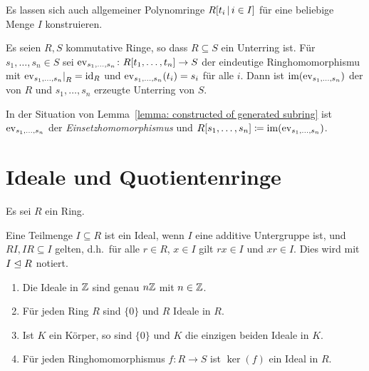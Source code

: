 \begin{remark}
  Es lassen sich auch allgemeiner Polynomringe $R[t_i \suchthat i \in I]$ für eine beliebige Menge $I$ konstruieren.
\end{remark}

\begin{lemma}
  \label{lemma: constructed of generated subring}
  Es seien $R, S$ kommutative Ringe, so dass $R \subseteq S$ ein Unterring ist.
  Für $s_1, \dotsc, s_n \in S$ sei $\operatorname{ev}_{s_1, \dotsc, s_n} \colon R[t_1, \dotsc, t_n] \to S$ der eindeutige Ringhomomorphismu mit $\restrict{\eval_{s_1, \dotsc, s_n}}{R} = \id_R$ und $\operatorname{ev}_{s_1, \dotsc, s_n}(t_i) = s_i$ für alle $i$.
  Dann ist $\operatorname{im}(\operatorname{ev}_{s_1, \dotsc, s_n})$ der von $R$ und $s_1, \dotsc, s_n$ erzeugte Unterring von $S$.
\end{lemma}

\begin{definition}
  In der Situation von Lemma~\ref{lemma: constructed of generated subring} ist $\operatorname{ev}_{s_1, \dotsc, s_n}$ der \emph{Einsetzhomomorphismus} und $R[s_1, \dotsc, s_n] \coloneqq \operatorname{im}(\operatorname{ev}_{s_1, \dotsc, s_n})$.
\end{definition}



\section{Ideale und Quotientenringe}

Es sei $R$ ein Ring.

\begin{definition}
  Eine Teilmenge $I \subseteq R$ ist ein Ideal, wenn $I$ eine additive Untergruppe ist, und $RI, IR \subseteq I$ gelten, d.h.\ für alle $r \in R$, $x \in I$ gilt $rx \in I$ und $xr \in I$.
  Dies wird mit $I \mathrel{\trianglelefteq} R$ notiert.
\end{definition}

\begin{example}
  \begin{enumerate}
    \item
      Die Ideale in $\mathbb{Z}$ sind genau $n\mathbb{Z}$ mit $n \in \mathbb{Z}$.
    \item
      Für jeden Ring $R$ sind $\{0\}$ und $R$ Ideale in $R$.
    \item
      Ist $K$ ein Körper, so sind $\{0\}$ und $K$ die einzigen beiden Ideale in $K$.
    \item
      Für jeden Ringhomomorphismus $f \colon R \to S$ ist $\ker(f)$ ein Ideal in $R$.
  \end{enumerate}
\end{example}

